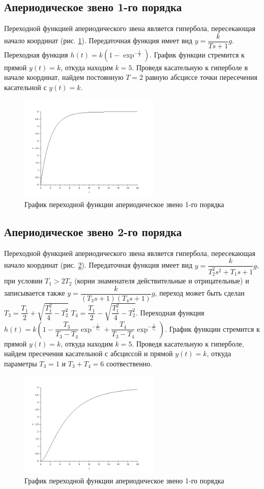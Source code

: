 \documentclass[a4paper,12pt,russian]{article} %
\begin{document}
\subsection{Апериодическое звено 1-го порядка}
Переходной функцией апериодического звена является гипербола, пересекающая начало координат (рис. \ref{plot_ap}). Передаточная функция имеет вид $y=\dfrac{k}{Ts+1}g$. Переходная функция $h(t)=k(1-\exp^{-\frac{t}{T}})$. График функции стремится к прямой $y(t)=k$, откуда находим  $k=5$. Проведя касательную к гиперболе в начале координат, найдем постоянную $T=2$ равную абсциссе точки пересечения касательной с  $y(t)=k$.
\begin{figure}[H]
	\centering\includegraphics[width=0.6\textwidth]{plot_ap.png}
	\caption{График переходной функции апериодическое звено 1-го порядка}\label{plot_ap}
\end{figure}

\subsection{Апериодическое звено 2-го порядка}
Переходной функцией апериодического звена является гипербола, пересекающая начало координат (рис. \ref{plot_app}). Передаточная функция имеет вид $y=\dfrac{k}{T_2^2s^2+T_1s+1}g$, при условии $T_1>2T_2$ (корни знаменателя действительные и отрицательные) и записывается также $y=\dfrac{k}{(T_3s+1)(T_4s+1)}g$, переход может быть сделан $T_3=\dfrac{T_1}{2}+\sqrt{\dfrac{T_1^2}{4}-T_2^2}$ $T_4=\dfrac{T_1}{2}-\sqrt{\dfrac{T_1^2}{4}-T_2^2}$.
Переходная функция $h(t)=k(1-\dfrac{T_3}{T_3-T_4}\exp^{-\frac{t}{T_3}}+\dfrac{T_4}{T_3-T_4}\exp^{-\frac{t}{T_4}})$. График функции стремится к прямой $y(t)=k$, откуда находим  $k=5$. Проведя касательную к гиперболе, найдем пресечения касательной с абсциссой и прямой $y(t)=k$, откуда параметры $T_3=1$ и $T_3+T_4=6$ соотвественно. 
\begin{figure}[H]
	\centering\includegraphics[width=0.6\textwidth]{plot_app.png}
	\caption{График переходной функции апериодическое звено 1-го порядка}\label{plot_app}
\end{figure}
\end{document}
